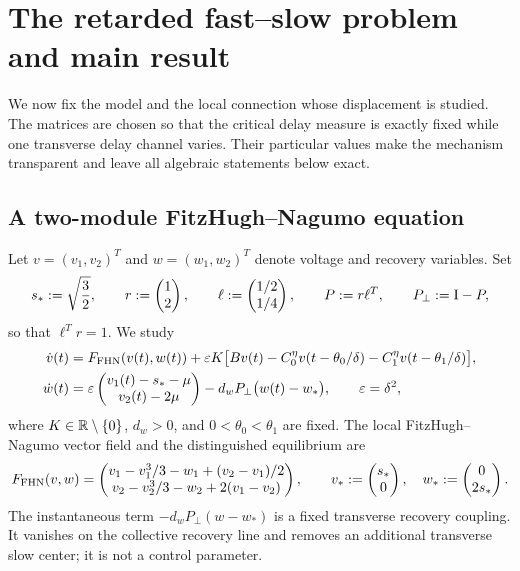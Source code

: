 \section{The retarded fast--slow problem and main result}
\label{sec:model-main}

We now fix the model and the local connection whose displacement is studied.
The matrices are chosen so that the critical delay measure is exactly fixed
while one transverse delay channel varies.  Their particular values make the
mechanism transparent and leave all algebraic statements below exact.

\subsection{A two-module FitzHugh--Nagumo equation}

Let \(v=(v_1,v_2)^T\) and \(w=(w_1,w_2)^T\) denote voltage and recovery
variables.  Set
\[
 s_*:=\sqrt{\frac32},\qquad
 r:=\begin{pmatrix}1\\2\end{pmatrix},\qquad
 \ell:=\begin{pmatrix}1/2\\1/4\end{pmatrix},\qquad
 P:=r\ell^T,\qquad P_\perp:=\mathrm I-P,
\]
so that \(\ell^Tr=1\).  We study
\begin{equation}
\label{eq:physical-model}
\begin{aligned}
 \dot v(t)={}&F_{\rm FHN}(v(t),w(t))
 +\varepsilon K\bigl[Bv(t)-C_0^\eta v(t-\theta_0/\delta)
                    -C_1^\eta v(t-\theta_1/\delta)\bigr],\\
 \dot w(t)={}&\varepsilon\begin{pmatrix}v_1(t)-s_*-\mu\\v_2(t)-2\mu\end{pmatrix}
              -d_wP_\perp\bigl(w(t)-w_*\bigr),
 \qquad \varepsilon=\delta^2,
\end{aligned}
\end{equation}
where \(K\in\mathbb R\setminus\{0\}\), \(d_w>0\), and
\(0<\theta_0<\theta_1\) are fixed.  The local FitzHugh--Nagumo vector field
and the distinguished equilibrium are
\begin{equation}
\label{eq:FHN-field}
 F_{\rm FHN}(v,w)=\begin{pmatrix}
 v_1-v_1^3/3-w_1+(v_2-v_1)/2\\
 v_2-v_2^3/3-w_2+2(v_1-v_2)\end{pmatrix},\qquad
 v_*:=\begin{pmatrix}s_*\\0\end{pmatrix},\quad w_*:=\begin{pmatrix}0\\2s_*\end{pmatrix}.
\end{equation}
The instantaneous term \(-d_wP_\perp(w-w_*)\) is a fixed transverse
recovery coupling.  It vanishes on the collective recovery line and removes
an additional transverse slow center; it is not a control parameter.

